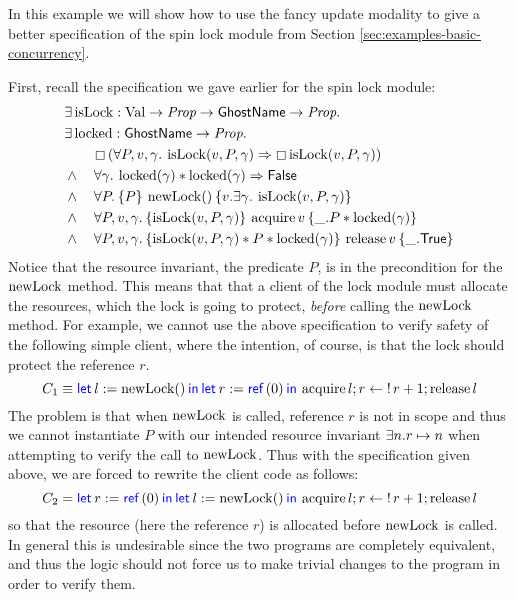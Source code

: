 \begin{example}
  \label{ex:improved-spec-spin-lock}
  In this example we will show how to use the fancy update modality to give a better specification of the spin lock module from Section \ref{sec:examples-basic-concurrency}.

  First, recall the specification we gave earlier for the spin lock module:
    \begin{align*}
    &\Exists \isLock : \Val \to \Prop \to \textlog{GhostName} \to \Prop.\nonumber\\
    &\Exists \locked : \textlog{GhostName} \to \Prop.\nonumber\\
    &\quad\quad\persistently\left(\All P, v, \gamma. \isLock(v,P,\gamma) \implies \persistently \isLock(v,P,\gamma)\right)\\
    &\land\quad\All \gamma. \locked(\gamma) \ast \locked(\gamma) \implies \FALSE\\
    &\land\quad\All P.\hoare{P}{\newLock ()}{v.\Exists \gamma.\isLock(v,P,\gamma)}\\
    &\land\quad\All P, v, \gamma.\hoare{\isLock(v,P,\gamma)}{\acquire v}{\_.P \ast \locked(\gamma)}\\
    &\land\quad\All P, v, \gamma.\hoare{\isLock(v,P,\gamma) \ast P \ast \locked(\gamma)}{\release v}{\_.\TRUE}
  \end{align*}
%
  Notice that the resource invariant, the predicate $P$, is in the 
  precondition for the $\operatorname{newLock}$ method. This means that that a client of the lock module must allocate the resources, which the lock is going to protect, \emph{before} calling the $\operatorname{newLock}$ method. For example, we cannot use the above specification to verify
  safety of the following simple client, where the 
  intention, of course, is that the lock should protect the reference $r$.
  \begin{displaymath}
   C_{1} \equiv
    \Let l = \newLock () in
    \Let r = \Ref(0) in
    \acquire l; r \gets \deref{r} + 1; \release l
  \end{displaymath}
  The problem is that when $\operatorname{newLock}$ is called, reference $r$ is not in scope
  and thus we cannot
  instantiate $P$ with our intended resource invariant $\exists n.r\mapsto n$
  when attempting to verify
  the call to $\operatorname{newLock}$.
  Thus with the specification given above, we are forced to rewrite the client code
  as follows:
  \begin{displaymath}
  C_{2} =
    \Let r = \Ref(0) in
    \Let l = \newLock () in
    \acquire l; r \gets \deref{r} + 1; \release l
  \end{displaymath}
  so that the resource (here the reference $r$) is allocated before $\operatorname{newLock}$ is called.
  In general this is undesirable since the two programs are completely equivalent, and thus the logic should not force us to make trivial changes to the program in order to verify them.


\end{example}
